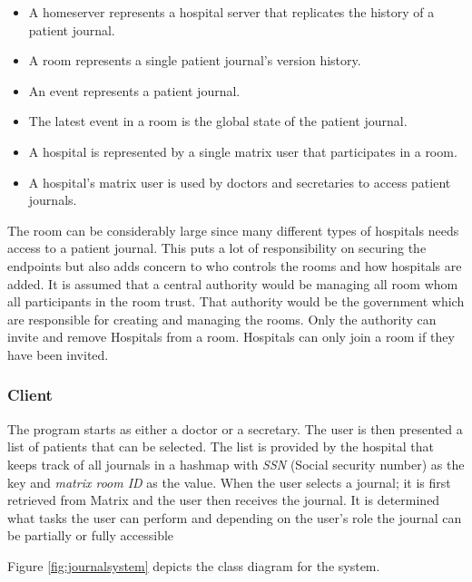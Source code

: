 \begin{itemize}
	\item A homeserver represents a hospital server that replicates the history of a patient journal. 
	\item A room represents a single patient journal's version history.
	\item An event represents a patient journal.  
	\item The latest event in a room is the global state of the patient journal.
	\item A hospital is represented by a single matrix user that participates in a room.
	\item A hospital's matrix user is used by doctors and secretaries to access patient journals. 
\end{itemize}


The room can be considerably large since many different types of hospitals needs access to a patient journal. This puts a lot of responsibility on securing the endpoints but also adds concern to who controls the rooms and how hospitals are added. It is assumed that a central authority would be managing all room whom all participants in the room trust. That authority would be the government which are responsible for creating and managing the rooms. Only the authority can invite and remove Hospitals from a room. Hospitals can only join a room if they have been invited.


\subsubsection{Client}

The program starts as either a doctor or a secretary. The user is then presented a list of patients that can be selected. The list is provided by the hospital that keeps track of all journals in a hashmap with \emph{SSN} (Social security number) as the key and \emph{matrix room ID} as the value. When the user selects a journal; it is first retrieved from Matrix and the user then receives the journal. It is determined what tasks the user can perform and depending on the user's role the journal can be partially or fully accessible 

Figure \ref{fig:journalsystem} depicts the class diagram for the system.



